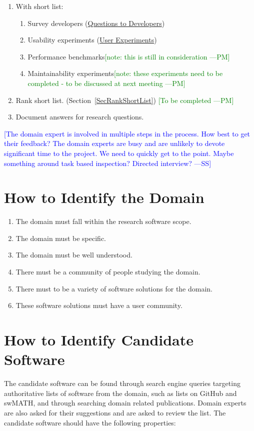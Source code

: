\documentclass[letterpaper,cleveref]{lipics-v2019}
\newcommand{\authornote}[3]{\textcolor{#1}{[#3 ---#2]}}
\newcommand{\authornote}[3]{}
\newcommand{\wss}[1]{\authornote{blue}{SS}{#1}} %
\newcommand{\pmi}[1]{\authornote{green}{PM}{#1}} %
\theoremstyle{definition}
\begin{document}
\begin{enumerate}
\item With short list:
\begin{enumerate}
\item Survey developers (\href{run:Questions to Developers.pdf}{Questions to Developers})
\item Usability experiments (\href{run:User Experiments.pdf}{User Experiments})
\item Performance benchmarks\pmi{note: this is still in consideration}
\item Maintainability experiments\pmi{note: these experiments need to be completed - to be discussed at next meeting}
\end{enumerate}
\item Rank short list. (Section~\ref{SecRankShortList}) \pmi{To be completed}
\item Document answers for research questions.
\end{enumerate}

\wss{The domain expert is involved in multiple steps in the process.  How best
  to get their feedback?  The domain experts are busy and are unlikely to devote
  significant time to the project.  We need to quickly get to the point.  Maybe
  something around task based inspection?  Directed interview?}


\section{How to Identify the Domain} \label{SecIdentifyDomain}
\begin{enumerate}	
	\item The domain must fall within the research software scope.
	\item The domain must be specific.
	\item The domain must be well understood.
	\item There must be a community of people studying the domain.
	\item There must to be a variety of software solutions for the domain.
	\item These software solutions must have a user community.
\end{enumerate}


\section{How to Identify Candidate Software} \label{SecIdentifyCandSoft}
The candidate software can be found through search engine queries targeting authoritative lists of software from the domain, such as lists on GitHub and swMATH, and through searching domain related publications. Domain experts are also asked for their suggestions and are asked to review the list. The candidate software should have the following properties:
\end{document}
